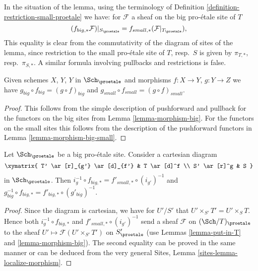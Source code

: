 \noindent
In the situation of the lemma, using the terminology of
Definition \ref{definition-restriction-small-proetale}
we have: for $\mathcal{F}$ a sheaf on the big pro-\'etale site of $T$
\begin{equation}
\label{equation-compare-big-small}
(f_{big, *}\mathcal{F})|_{S_\proetale} =
f_{small, *}(\mathcal{F}|_{T_\proetale}),
\end{equation}
This equality is clear from the commutativity of the diagram of
sites of the lemma, since restriction to the small pro-\'etale site of
$T$, resp.\ $S$ is given by $\pi_{T, *}$, resp.\ $\pi_{S, *}$. A similar
formula involving pullbacks and restrictions is false.

\begin{lemma}
\label{lemma-composition-proetale}
Given schemes $X$, $Y$, $Y$ in $\Sch_\proetale$
and morphisms $f : X \to Y$, $g : Y \to Z$ we have
$g_{big} \circ f_{big} = (g \circ f)_{big}$ and
$g_{small} \circ f_{small} = (g \circ f)_{small}$.
\end{lemma}

\begin{proof}
This follows from the simple description of pushforward
and pullback for the functors on the big sites from
Lemma \ref{lemma-morphism-big}. For the functors
on the small sites this follows from the description of
the pushforward functors in Lemma \ref{lemma-morphism-big-small}.
\end{proof}

\begin{lemma}
\label{lemma-morphism-big-small-cartesian-diagram}
Let $\Sch_\proetale$ be a big pro-\'etale site. Consider a cartesian diagram
$$
\xymatrix{
T' \ar[r]_{g'} \ar[d]_{f'} & T \ar[d]^f \\
S' \ar[r]^g & S
}
$$
in $\Sch_\proetale$. Then
$i_g^{-1} \circ f_{big, *} = f'_{small, *} \circ (i_{g'})^{-1}$
and $g_{big}^{-1} \circ f_{big, *} = f'_{big, *} \circ (g'_{big})^{-1}$.
\end{lemma}

\begin{proof}
Since the diagram is cartesian, we have for $U'/S'$
that $U' \times_{S'} T' = U' \times_S T$. Hence both
$i_g^{-1} \circ f_{big, *}$ and $f'_{small, *} \circ (i_{g'})^{-1}$
send a sheaf $\mathcal{F}$ on $(\Sch/T)_\proetale$ to the sheaf
$U' \mapsto \mathcal{F}(U' \times_{S'} T')$ on $S'_\proetale$
(use Lemmas \ref{lemma-put-in-T} and \ref{lemma-morphism-big}).
The second equality can be proved in the same manner or can be
deduced from the very general
Sites, Lemma \ref{sites-lemma-localize-morphism}.
\end{proof}

